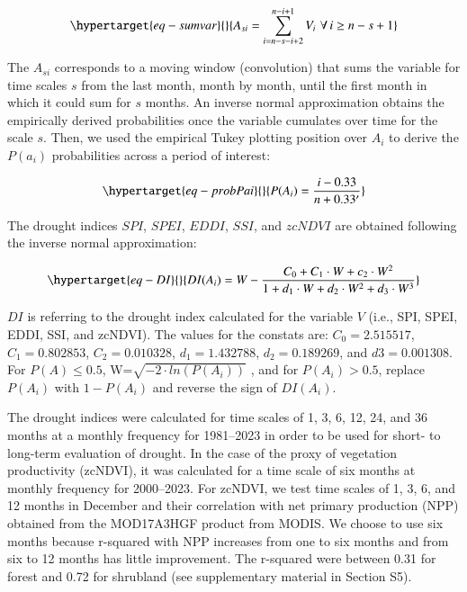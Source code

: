 \documentclass[
  authoryear,
  preprint,
  3p,
  onecolumn]{elsarticle}
\begin{document}
\begin{equation}\protect\hypertarget{eq-sumvar}{}{A_{si} = \sum_{i=n-s-i+2}^{n-i+1} V_i\,\, \forall\, i\geq n-s+1  }\label{eq-sumvar}\end{equation}

The \(A_{si}\) corresponds to a moving window (convolution) that sums
the variable for time scales \(s\) from the last month, month by month,
until the first month in which it could sum for \(s\) months. An inverse
normal approximation \citep{Abramowitz1968} obtains the empirically
derived probabilities once the variable cumulates over time for the
scale \(s\). Then, we used the empirical Tukey plotting position
\citep{Wilks2011} over \(A_i\) to derive the \(P(a_i)\) probabilities
across a period of interest:

\begin{equation}\protect\hypertarget{eq-probPai}{}{P(A_i) = \frac{i-0.33}{n+0.33'}}\label{eq-probPai}\end{equation}

The drought indices \(SPI\), \(SPEI\), \(EDDI\), \(SSI\), and \(zcNDVI\)
are obtained following the inverse normal approximation:

\begin{equation}\protect\hypertarget{eq-DI}{}{DI(A_i) = W - \frac{C_0+C_1\cdot W + c_2 \cdot W^2}{1+d_1\cdot W +d_2\cdot W^2 +d_3\cdot W^3}}\label{eq-DI}\end{equation}

\(DI\) is referring to the drought index calculated for the variable
\(V\) (i.e., SPI, SPEI, EDDI, SSI, and zcNDVI). The values for the
constats are: \(C_0 = 2.515517\), \(C_1 = 0.802853\),
\(C_2 = 0.010328\), \(d_1 = 1.432788\), \(d_2 = 0.189269\), and
\(d3 = 0.001308\). For \(P(A) \leq 0.5\),
W=\(\sqrt{-2\cdot ln(P(A_i))}\) , and for \(P(A_i) > 0.5\), replace
\(P(A_i)\) with \(1-P(A_i)\) and reverse the sign of \(DI(A_i)\).

The drought indices were calculated for time scales of 1, 3, 6, 12, 24,
and 36 months at a monthly frequency for 1981--2023 in order to be used
for short- to long-term evaluation of drought. In the case of the proxy
of vegetation productivity (zcNDVI), it was calculated for a time scale
of six months at monthly frequency for 2000--2023. For zcNDVI, we test
time scales of 1, 3, 6, and 12 months in December and their correlation
with net primary production (NPP) obtained from the MOD17A3HGF product
from MODIS. We choose to use six months because r-squared with NPP
increases from one to six months and from six to 12 months has little
improvement. The r-squared were between 0.31 for forest and 0.72 for
shrubland (see supplementary material in Section S5).
\end{document}
